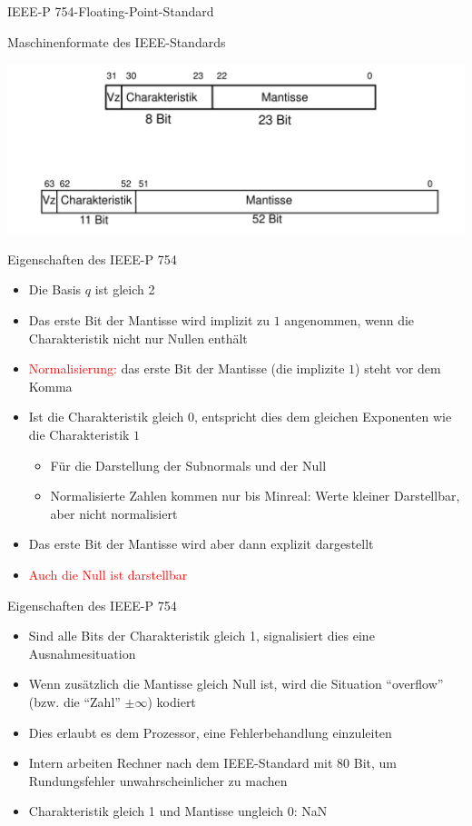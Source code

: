 \documentclass[12pt%
,xcolor=table
,aspectratio=169%
]{beamer}
\begin{document}
\begin{frame}{IEEE-P 754-Floating-Point-Standard}
\begin{center}
	Maschinenformate des IEEE-Standards
\end{center}
\center
\includegraphics[scale=0.35]{pictures/ieee_machineformat}
\end{frame}

\begin{frame}{Eigenschaften des IEEE-P 754}
\begin{itemize}
	\item Die Basis $q$ ist gleich 2
	\item Das erste Bit der Mantisse wird implizit zu $1$ angenommen, wenn die Charakteristik nicht nur Nullen enthält
	\item \textcolor{red}{Normalisierung:} das erste Bit der Mantisse (die implizite $1$) steht vor dem Komma
	\item Ist die Charakteristik gleich 0, entspricht dies dem gleichen Exponenten wie die Charakteristik $1$
	\begin{itemize}
		\item Für die Darstellung der Subnormals und der Null
		\item Normalisierte Zahlen kommen nur bis Minreal: Werte kleiner Darstellbar, aber nicht normalisiert
	\end{itemize}
	\item Das erste Bit der Mantisse wird aber dann explizit dargestellt
	\item \textcolor{red}{Auch die Null ist darstellbar}
\end{itemize}
\end{frame}

\begin{frame}{Eigenschaften des IEEE-P 754}
\begin{itemize}
	\item Sind alle Bits der Charakteristik gleich 1, signalisiert dies eine Ausnahmesituation
	\item Wenn zusätzlich die Mantisse gleich Null ist, wird die Situation \enquote{overflow} (bzw. die \enquote{Zahl} $\pm \infty$) kodiert
	\item Dies erlaubt es dem Prozessor, eine Fehlerbehandlung einzuleiten
	\item Intern arbeiten Rechner nach dem IEEE-Standard mit 80 Bit, um Rundungsfehler unwahrscheinlicher zu machen
	\item Charakteristik gleich 1 und Mantisse ungleich 0: NaN
\end{itemize}
\end{frame}
\end{document}
